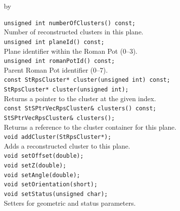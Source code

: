 \documentclass[twoside]{article}
\newcommand{\entrylabel}[1]{\mbox{\textbf{{#1}}}\hfil}%
\newenvironment{entry}
{\begin{list}{}%
    {\renewcommand{\makelabel}{\entrylabel}%
     \setlength{\labelwidth}{90pt}%
     \setlength{\leftmargin}{\labelwidth}
     \advance\leftmargin by \labelsep%
      }%
    }%
  {\end{list}}
\newcommand{\Entrylabel}[1]%
{\raisebox{0pt}[1ex][0pt]{\makebox[\labelwidth][l]%
    {\parbox[t]{\labelwidth}{\hspace{0pt}\textbf{{#1}}}}}}
\newenvironment{Entry}%
{\renewcommand{\entrylabel}{\Entrylabel}\begin{entry}}%
  {\end{entry}}
\begin{document}
\begin{Entry}
    \verb+unsigned int numberOfClusters() const;+\\
    Number of reconstructed clusters in this plane.\\
    \verb+unsigned int planeId() const;+\\
    Plane identifier within the Roman Pot (0--3).\\
    \verb+unsigned int romanPotId() const;+\\
    Parent Roman Pot identifier (0--7).\\
    \verb+const StRpsCluster* cluster(unsigned int) const;+\\
    \verb+StRpsCluster* cluster(unsigned int);+\\
    Returns a pointer to the cluster at the given index.\\
    \verb+const StSPtrVecRpsCluster& clusters() const;+\\
    \verb+StSPtrVecRpsCluster& clusters();+\\
    Returns a reference to the cluster container for this plane.\\
    \verb+void addCluster(StRpsCluster*);+\\
    Adds a reconstructed cluster to this plane.\\
    \verb+void setOffset(double);+\\
    \verb+void setZ(double);+\\
    \verb+void setAngle(double);+\\
    \verb+void setOrientation(short);+\\
    \verb+void setStatus(unsigned char);+\\
    Setters for geometric and status parameters.\\
\end{Entry}
\clearpage

\end{document}

